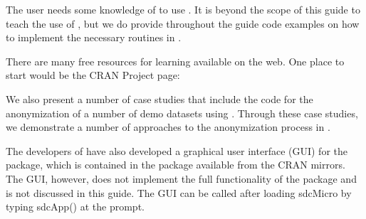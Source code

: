 \documentclass[letterpaper,10pt,english]{sphinxmanual}
\begin{document}
The user needs some knowledge of  to use . It is beyond the
scope of this guide to teach the use of , but we do provide
throughout the guide code examples on how to implement the necessary
routines in . %
\begin{footnote}[4]\sphinxAtStartFootnote
There are many free resources for learning  available on the web.
One place to start would be the CRAN  Project page:
%
\end{footnote} We also present a number of case
studies that include the code for the anonymization of a number of demo
datasets using . Through these case studies, we demonstrate a number
of approaches to the anonymization process in . %
\begin{footnote}[5]\sphinxAtStartFootnote
The developers of  have also developed a graphical user
interface (GUI) for the package, which is contained in the  package available from the CRAN mirrors. The GUI,
however, does not implement the full functionality of the 
package and is not discussed in this guide. The GUI can be called after loading sdcMicro by typing sdcApp() at the prompt.
%
\end{footnote}
\end{document}

